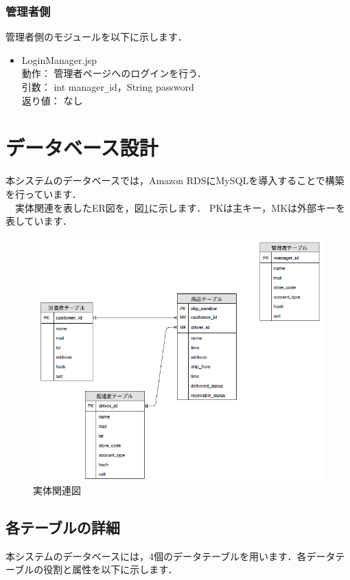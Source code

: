 \documentclass[a4j,titlepage]{jarticle}
\begin{document}
\subsubsection{管理者側}
管理者側のモジュールを以下に示します．
\begin{itemize}
\item LoginManager.jsp\\
動作： 管理者ページへのログインを行う．\\
引数： int manager\verb|_|id，String password\\
返り値： なし
\end{itemize}


\section{データベース設計}
本システムのデータベースでは，Amazon RDSにMySQLを導入することで構築を行っています．\\
　実体関連を表したER図を，図\ref{fig:erd}に示します．
PKは主キー，MKは外部キーを表しています．
\begin{figure}[H]
 \begin{center}
  \includegraphics[width=150mm]{erd.png}
  \caption{実体関連図}
  \label{fig:erd}
 \end{center}
\end{figure}
 
\subsection{各テーブルの詳細}
本システムのデータベースには，4個のデータテーブルを用います．各データテーブルの役割と属性を以下に示します．
\end{document}
